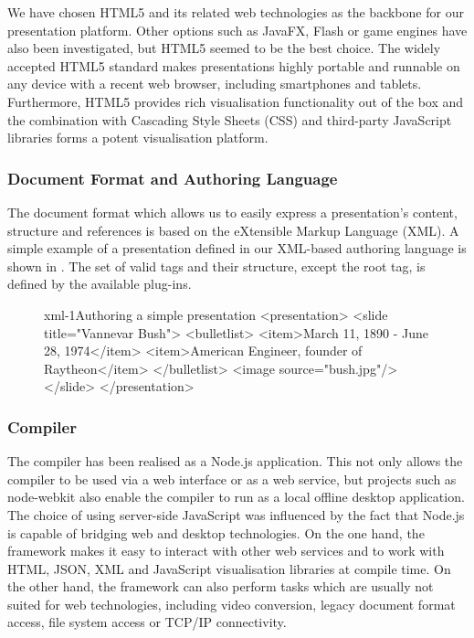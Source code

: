\documentclass[a4paper,12pt]{report}
\begin{document}
    We have chosen HTML5 and its related web technologies as the backbone for
    our \mxp presentation platform. Other options such as JavaFX, Flash or game
    engines have also been investigated, but HTML5 seemed to be the best choice.
    The widely accepted HTML5 standard makes \mxp presentations highly portable and
    runnable on any device with a recent web browser, including smartphones and
    tablets. Furthermore, HTML5 provides rich visualisation functionality out of
    the box and the combination with Cascading Style Sheets
    (CSS) and third-party JavaScript libraries forms a potent visualisation
    platform.

    \subsubsection{Document Format and Authoring Language}

     The \mxp document format which allows us to easily express a
     presentation's content, structure and references is based on the
     eXtensible Markup Language (XML). A simple example of a presentation
     defined in our XML-based authoring language is shown in .
     The set of valid tags and their structure, except the 
     root tag, is defined by the available plug-ins.

     \begin{figure}[h!]
      \begin{lstxml}{xml-1}{Authoring a simple \mxp presentation}
<presentation>
  <slide title="Vannevar Bush">
    <bulletlist>
      <item>March 11, 1890 - June 28, 1974</item>
      <item>American Engineer, founder of Raytheon</item>
    </bulletlist>
    <image source="bush.jpg"/>
  </slide>
</presentation>
      \end{lstxml}
     \end{figure}

    \subsubsection{Compiler}

     The compiler has been realised as a Node.js application. This not only
     allows the compiler to be used via a web interface or as a web service,
     but projects such as node-webkit also enable the compiler to run as a
     local offline desktop application. The choice of using server-side
     JavaScript was influenced by the fact that Node.js is capable of bridging
     web and desktop technologies. On the one hand, the framework makes it easy
     to interact with other web services and to work with HTML, JSON, XML and
     JavaScript visualisation libraries at compile time. On the other hand, the
     framework can also perform tasks which are usually not suited for web
     technologies, including video conversion, legacy document format access,
     file system access or TCP/IP connectivity.
\end{document}
